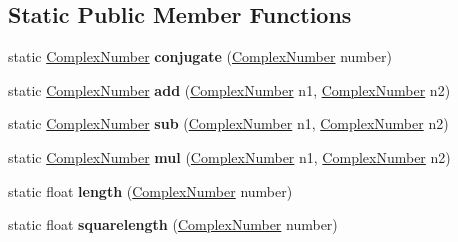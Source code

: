 \subsection*{Static Public Member Functions}
\begin{DoxyCompactItemize}
\item 
\hypertarget{struct_complex_number_ac3308b52bad2932975f38314fdcec137}{static \hyperlink{struct_complex_number}{Complex\-Number} {\bfseries conjugate} (\hyperlink{struct_complex_number}{Complex\-Number} number)}\label{struct_complex_number_ac3308b52bad2932975f38314fdcec137}

\item 
\hypertarget{struct_complex_number_a95ae1236599c97952da75354baa3885c}{static \hyperlink{struct_complex_number}{Complex\-Number} {\bfseries add} (\hyperlink{struct_complex_number}{Complex\-Number} n1, \hyperlink{struct_complex_number}{Complex\-Number} n2)}\label{struct_complex_number_a95ae1236599c97952da75354baa3885c}

\item 
\hypertarget{struct_complex_number_a9532b029f213ac9ef0549368b150ab8b}{static \hyperlink{struct_complex_number}{Complex\-Number} {\bfseries sub} (\hyperlink{struct_complex_number}{Complex\-Number} n1, \hyperlink{struct_complex_number}{Complex\-Number} n2)}\label{struct_complex_number_a9532b029f213ac9ef0549368b150ab8b}

\item 
\hypertarget{struct_complex_number_a4ac17e015bc06375b2f1e0a1be6fd916}{static \hyperlink{struct_complex_number}{Complex\-Number} {\bfseries mul} (\hyperlink{struct_complex_number}{Complex\-Number} n1, \hyperlink{struct_complex_number}{Complex\-Number} n2)}\label{struct_complex_number_a4ac17e015bc06375b2f1e0a1be6fd916}

\item 
\hypertarget{struct_complex_number_a14a2b1a10621de26dd96f16fc806b3fb}{static float {\bfseries length} (\hyperlink{struct_complex_number}{Complex\-Number} number)}\label{struct_complex_number_a14a2b1a10621de26dd96f16fc806b3fb}

\item 
\hypertarget{struct_complex_number_a657200081da393984111b6c537cf94dd}{static float {\bfseries squarelength} (\hyperlink{struct_complex_number}{Complex\-Number} number)}\label{struct_complex_number_a657200081da393984111b6c537cf94dd}

\end{DoxyCompactItemize}
